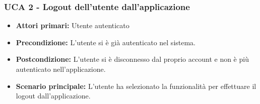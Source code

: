 \newpage
\subsubsection{UCA 2 - Logout dell'utente dall'applicazione}%
\begin{itemize}
\item \textbf{Attori primari:} Utente autenticato
\item \textbf{Precondizione:} L'utente si è già autenticato nel sistema.
\item \textbf{Postcondizione:}  L'utente si è disconnesso dal proprio account e non è più autenticato nell'applicazione.
\item \textbf{Scenario principale:} L'utente ha selezionato la funzionalità per effettuare il logout dall'applicazione.
\end{itemize}